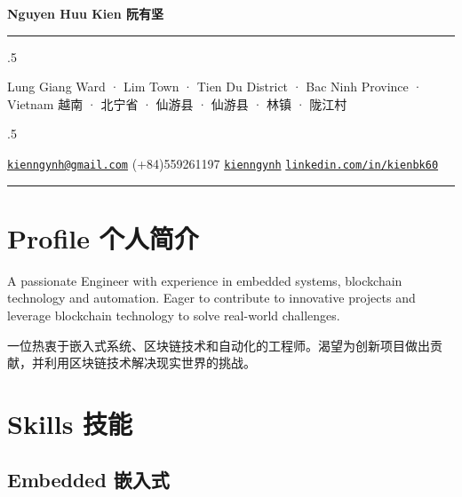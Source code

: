 \documentclass[
]
{article}
\begin{document}
\centerline{\huge \bf Nguyen Huu Kien \textbar{} 阮有坚}

\vspace{2 mm}

\hrule

\vspace{2 mm}


\moveleft.5\hoffset\centerline{Lung Giang Ward · Lim Town · Tien Du
District · Bac Ninh Province · Vietnam \textbar{} 越南 · 北宁省 · 仙游县
· 仙游县 · 林镇 · 陇江村}
\moveleft.5\hoffset\centerline{ \faEnvelope \hspace{1 mm} \href{mailto:}{\tt kienngynh@gmail.com} \hspace{1 mm}  \faPhone \hspace{1 mm}  (+84)559261197  \hspace{1 mm}  \faGithub \hspace{1 mm} \href{http://github.com/kienngynh}{\tt kienngynh} \hspace{1 mm}      \faGlobe \hspace{1 mm} \href{http://linkedin.com/in/kienbk60}{\tt linkedin.com/in/kienbk60}      }



\vspace{2 mm}

\hrule



\section{Profile \textbar{}
个人简介}\label{profile-ux4e2aux4ebaux7b80ux4ecb}

A passionate Engineer with experience in embedded systems, blockchain
technology and automation. Eager to contribute to innovative projects
and leverage blockchain technology to solve real-world challenges.

\begin{figure*}

一位热衷于嵌入式系统、区块链技术和自动化的工程师。渴望为创新项目做出贡献，并利用区块链技术解决现实世界的挑战。

\end{figure*}%

\section{Skills \textbar{} 技能}\label{skills-ux6280ux80fd}

\subsection{Embedded \textbar{}
嵌入式}\label{embedded-ux5d4cux5165ux5f0f}
\end{document}
